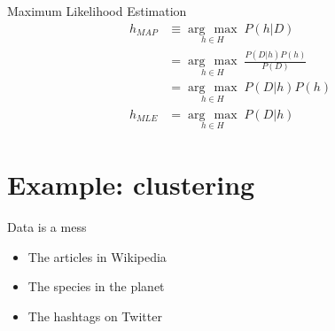 \documentclass[handout]{beamer}
\newcommand{\argmax}[1]{\underset{#1}{\operatorname{arg}\,\operatorname{max}}\;}
\begin{document}
\begin{frame}{Maximum Likelihood Estimation}
\Large
\begin{equation}
    \begin{aligned}
        h_{MAP} &\equiv \argmax {h \in H} P(h|D)\\
                &= \argmax {h \in H} \frac{P(D|h)P(h)}{P(D)}\\
                &= \argmax {h \in H} P(D|h)P(h)\\
        h_{MLE} &= \argmax {h \in H} P(D|h)
    \end{aligned}
\end{equation}
\end{frame}

\section{Example: clustering}
\begin{frame}{Data is a mess}
    \begin{itemize}
        \item The articles in Wikipedia
        \item The species in the planet
        \item The hashtags on Twitter
    \end{itemize}
\end{frame}
\end{document}
